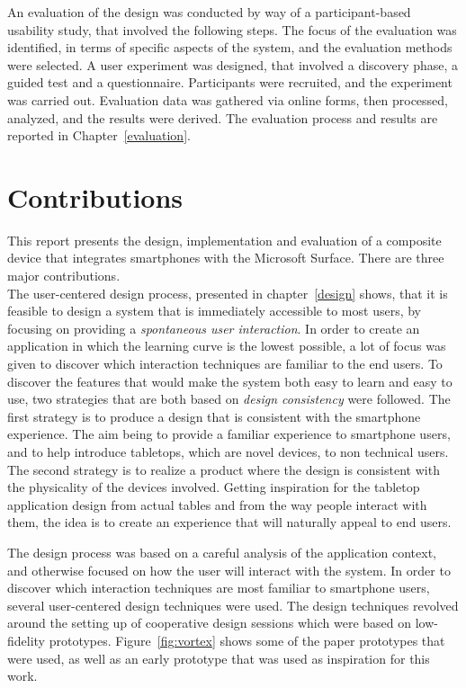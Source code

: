 An evaluation of the design was conducted by way of a participant-based usability study, that involved the following steps.
The focus of the evaluation was identified, in terms of specific aspects of the system, and the evaluation methods were selected.
A user experiment was designed, that involved a discovery phase, a guided test and a questionnaire.
Participants were recruited, and the experiment was carried out.
Evaluation data was gathered via online forms, then processed, analyzed, and the results were derived.
The evaluation process and results are reported in Chapter~\ref{evaluation}.

\section{Contributions}

This report presents the design, implementation and evaluation of a composite device that integrates smartphones with the Microsoft Surface.
There are three major contributions.
\\
\linebreak
The user-centered design process, presented in chapter~\ref{design} shows, that it is feasible to design a system that is immediately accessible to most users, by focusing on providing a \emph{spontaneous user interaction}.
In order to create an application in which the learning curve is the lowest possible, a lot of focus was given to discover which interaction techniques are familiar to the end users.
To discover the features that would make the system both easy to learn and easy to use, two strategies that are both based on \emph{design consistency} were followed.
The first strategy is to produce a design that is consistent with the smartphone experience.
The aim being to provide a familiar experience to smartphone users, and to help introduce tabletops, which are novel devices, to non technical users.
The second strategy is to realize a product where the design is consistent with the physicality of the devices involved.
Getting inspiration for the tabletop application design from actual tables and from the way people interact with them, the idea is to create an experience that will naturally appeal to end users. 

The design process was based on a careful analysis of the application context, and otherwise focused on how the user will interact with the system.
In order to discover which interaction techniques are most familiar to smartphone users, several user-centered design techniques were used.
The design techniques revolved around the setting up of cooperative design sessions which were based on low-fidelity prototypes.
Figure~\ref{fig:vortex} shows some of the paper prototypes that were used, as well as an early prototype that was used as inspiration for this work.

